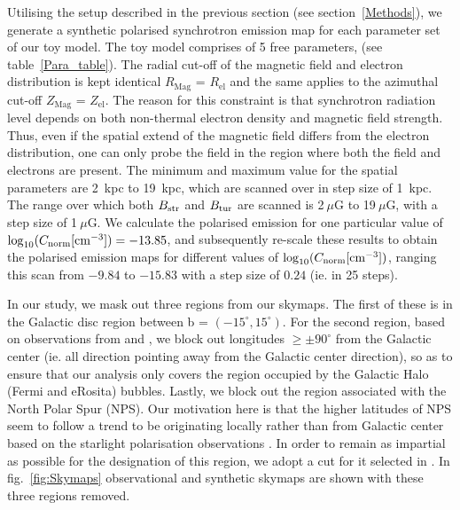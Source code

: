 \documentclass[12pt, a4 paper]{article}
\newcommand{\Andrew}[1]{\textcolor{dg}{#1}}
\newcommand{\Vasu}[1]{{\color{purple}#1}}
\begin{document}
Utilising the setup described in the previous section (see section~\ref{Methods}), we generate a synthetic polarised synchrotron emission map for each parameter set of our toy model. The toy model comprises of 5 free parameters, (see table~\ref{Para_table}). The radial cut-off of the magnetic field and electron distribution is kept identical $R_{\mathrm{Mag}}$ = $R_{\mathrm{el}}$ and the same applies to the azimuthal cut-off $Z_{\mathrm{Mag}}$ = $Z_{\mathrm{el}}$. The reason for this constraint is that synchrotron radiation level depends on both non-thermal electron density and magnetic field strength. Thus, even if the spatial extend of the magnetic field differs from the electron distribution, one can only probe the field in the region where both the field and electrons are present. The minimum and maximum value for the spatial parameters are 2~kpc to 19~kpc, which are scanned over in step size of 1~kpc. 
The range over which both $B_{\rm str}$ and $B_{\rm tur}$ are scanned is 2$~\mu$G to 19$~\mu$G, with a step size of 1$~\mu$G. We calculate the polarised emission for one particular value of $\log_{10}(C_{\rm norm}[{\rm cm}^{-3}]) = -13.85$, and subsequently re-scale these results to obtain the polarised emission maps for different values of  $\log_{10}(C_{\rm norm} [{\rm cm}^{-3}])$, ranging this scan from $-9.84$ to $-15.83$ with a step size of $0.24$ (ie. in 25 steps).



In our study, we mask out three regions from our skymaps. The first of these is in the Galactic disc region between b = $(-15^{\circ},15^{\circ})$. For the second region, based on observations from \cite{eROSITA} and \cite{Su_2010}, we block out longitudes  $\geq \pm 90^{\circ}$ from the Galactic center (ie. all direction pointing away from the Galactic center direction), so as to ensure that our analysis only covers the region occupied by the Galactic Halo (Fermi and eRosita) bubbles. Lastly, we block out the region associated with the North Polar Spur (NPS). Our motivation here is that the higher latitudes of NPS seem to follow a trend to be originating locally rather than from Galactic center based on the starlight polarisation observations \cite{Gina_2021}. In order to remain as impartial as possible for the designation of this region, we adopt a cut for it selected in \cite{Wolleben_2007}. In fig.~\ref{fig:Skymaps} observational and synthetic skymaps are shown with these three regions removed.
\end{document}
